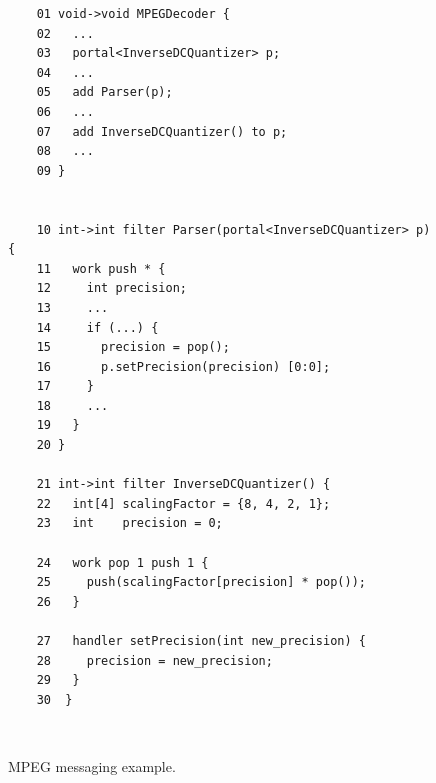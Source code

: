 \begin{figure}[t]
  \begin{minipage}[t]{3.8in}
    {
  \begin{scriptsize}
    \begin{verbatim}
	01 void->void MPEGDecoder {
	02   ...
	03   portal<InverseDCQuantizer> p;
	04   ...
	05   add Parser(p);
	06   ...
	07   add InverseDCQuantizer() to p;
	08   ...
	09 }


	10 int->int filter Parser(portal<InverseDCQuantizer> p) {
	11   work push * {
	12     int precision;
	13     ...
	14     if (...) {
	15       precision = pop();
	16       p.setPrecision(precision) [0:0];
	17     }
	18     ...
	19   }
	20 }

	21 int->int filter InverseDCQuantizer() {
	22   int[4] scalingFactor = {8, 4, 2, 1};
	23   int    precision = 0;

	24   work pop 1 push 1 {
	25     push(scalingFactor[precision] * pop());
	26   }

	27   handler setPrecision(int new_precision) {
	28     precision = new_precision;
	29   }
	30  }
    \end{verbatim}
  \end{scriptsize}
   \vspace{-3pt}
}
\end{minipage}
  ~~\vrule~~
  \begin{minipage}[t]{2.8in}
    {
        \vspace{50pt}

    }
\end{minipage}
  \caption{MPEG messaging example.}
  \label{fig:messaging}
   \end{figure}

